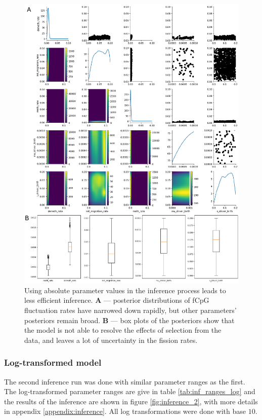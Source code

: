 \begin{figure}[h]
    \centering
    \includegraphics[width=\textwidth]{Chapter_5/figures/inference_raw/inference_1.pdf}
    \caption{Using absolute parameter values in the inference process leads to
    less efficient inference. \textbf{A} --- posterior distributions of fCpG
    fluctuation rates have narrowed down rapidly, but other parameters'
    posteriors remain broad. \textbf{B} --- box plots of the posteriors show
    that the model is not able to resolve the effects of selection from the
    data, and leaves a lot of uncertainty in the fission rates.}
    \label{fig:inference_1}
\end{figure}
\clearpage

\subsubsection{Log-transformed model}
The second inference run was done with similar parameter ranges as the first.
The log-transformed parameter ranges are give in table \ref{tab:inf_ranges_log}
and the results of the inference are shown in figure \ref{fig:inference_2}, with
more details in appendix \ref{appendix:inference}. All log transformations were
done with base $10$.


